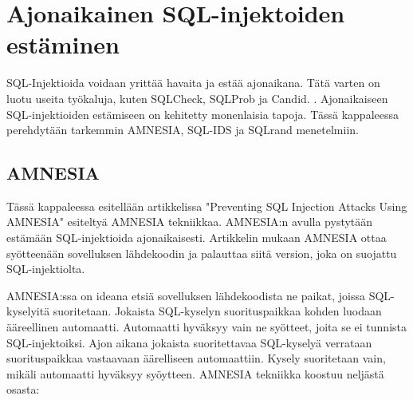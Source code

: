\documentclass[finnish]{tktltiki2}
\theoremstyle{definition}
\theoremstyle{remark}
\begin{document}
	\section{Ajonaikainen SQL-injektoiden estäminen}
	SQL-Injektioida voidaan yrittää havaita ja estää ajonaikana. Tätä varten on luotu useita työkaluja, kuten SQLCheck, SQLProb ja Candid. \cite{preventions}. Ajonaikaiseen SQL-injektioiden estämiseen on kehitetty monenlaisia tapoja. Tässä kappaleessa perehdytään tarkemmin AMNESIA, SQL-IDS ja SQLrand menetelmiin.
	
	\subsection{AMNESIA}
	Tässä kappaleessa esitellään artikkelissa "Preventing SQL Injection Attacks Using AMNESIA"\space\cite{amnesia} esiteltyä AMNESIA tekniikkaa. AMNESIA:n avulla pystytään estämään SQL-injektioida ajonaikaisesti. Artikkelin mukaan AMNESIA ottaa syötteenään sovelluksen lähdekoodin ja palauttaa siitä version, joka on suojattu SQL-injektiolta.
	
	 AMNESIA:ssa on ideana etsiä sovelluksen lähdekoodista ne paikat, joissa SQL-kyselyitä suoritetaan. Jokaista SQL-kyselyn suorituspaikkaa kohden luodaan ääreellinen automaatti. Automaatti hyväksyy vain ne syötteet, joita se ei tunnista SQL-injektoiksi. Ajon aikana jokaista suoritettavaa SQL-kyselyä verrataan suorituspaikkaa vastaavaan äärelliseen automaattiin. Kysely suoritetaan vain, mikäli automaatti hyväksyy syöytteen. AMNESIA tekniikka koostuu neljästä osasta:
\end{document}
